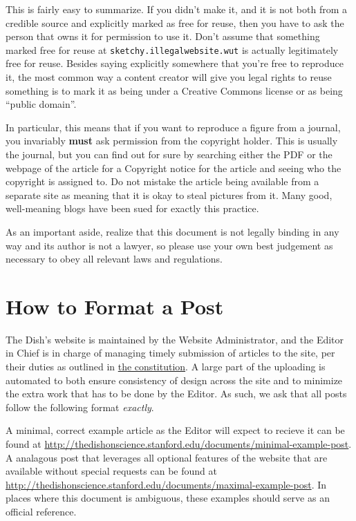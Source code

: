 \documentclass[paper=a4, fontsize=11pt]{scrartcl}
\numberwithin{equation}{section}        %
\numberwithin{figure}{section}            %
\numberwithin{table}{section}                %
\newcommand{\dishurlplain}[1]{http://thedishonscience.stanford.edu/#1}
\newcommand{\dishurl}[1]{\url{\dishurlplain{#1}}}
\begin{document}
This is fairly easy to summarize. If you didn't make it, and it is not both from
a credible source and explicitly marked as free for reuse, then you have to ask
the person that owns it for permission to use it. Don't assume that something
marked free for reuse at \texttt{sketchy.illegalwebsite.wut} is actually
legitimately free for reuse.  Besides saying explicitly somewhere that you're
free to reproduce it, the most common way a content creator will give you legal
rights to reuse something is to mark it as being under a Creative Commons
license or as being ``public domain''.

In particular, this means that if you want to reproduce a figure from a journal,
you invariably \textbf{must} ask permission from the copyright holder. This is
usually the journal, but you can find out for sure by searching either the PDF
or the webpage of the article for a Copyright notice for the article and seeing
who the copyright is assigned to. Do not mistake the article being available
from a separate site as meaning that it is okay to steal pictures from it. Many
good, well-meaning blogs have been sued for exactly this practice.

As an important aside, realize that this document is not legally binding in any
way and its author is not a lawyer, so please use your own best judgement as
necessary to obey all relevant laws and regulations.

\section{How to Format a Post}
The Dish's website is maintained by the Website Administrator, and the Editor in
Chief is in charge of managing timely submission of articles to the site, per
their duties as outlined in
\href{\dishurlplain{documents/dish-constitution.pdf}}{the constitution}. A
large part of the uploading is automated to both ensure consistency of design
across the site and to minimize the extra work that has to be done by the
Editor.  As such, we ask that all posts follow the following format
\textit{exactly}.

A minimal, correct example article as the Editor will expect to recieve it can
be found at \dishurl{documents/minimal-example-post}. A analagous post that
leverages all optional features of the website that are available without
special requests can be found at \dishurl{documents/maximal-example-post}. In
places where this document is ambiguous, these examples should serve as an
official reference.
\end{document}

